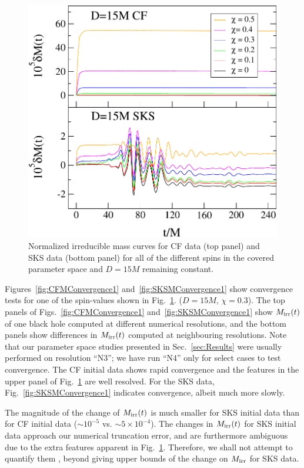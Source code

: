\begin{figure}
 \includegraphics[width=0.95\columnwidth]{chap5/MassIncreaseCFSKS}
  \caption{Normalized irreducible mass curves for CF data (top panel)
    and SKS data (bottom panel) for all of the different spins in the
    covered parameter space and $D=15M$ remaining constant. }
  \label{fig:MassIncreaseCFSKS}
\end{figure}

Figures~\ref{fig:CFMConvergence1} and~\ref{fig:SKSMConvergence1} show
convergence tests for one of the spin-values shown in
Fig.~\ref{fig:MassIncreaseCFSKS}.  ($D=15M$, $\chi=0.3$).  The top
panels of Figs.~\ref{fig:CFMConvergence1}
and~\ref{fig:SKSMConvergence1} show $M_{\rm irr}(t)$ of one black hole
computed at different numerical resolutions, and the bottom panels
show differences in $M_{\rm irr}(t)$ computed at neighbouring
resolutions.  Note that our parameter space studies presented in
Sec.~\ref{sec:Results} were usually performed on resolution ``N3''; we
have run ``N4'' only for select cases to test convergence.  The CF
initial data shows rapid convergence and the features in the upper
panel of Fig.~\ref{fig:MassIncreaseCFSKS} are well resolved.  For the
SKS data, Fig.~\ref{fig:SKSMConvergence1} indicates convergence,
albeit much more slowly.

The magnitude of the change of $M_{\rm irr}(t)$ is much smaller for
SKS initial data than for CF initial data ($\sim 10^{-5}$ vs. $\sim
5\times 10^{-4}$).  The changes in $M_{\rm irr}(t)$ for SKS initial
data approach our numerical truncation error, and are furthermore
ambiguous due to the extra features apparent in
Fig.~\ref{fig:MassIncreaseCFSKS}.  Therefore, we shall not attempt to
quantify them , beyond giving upper bounds of the change on
$M_{\rm irr}$ for SKS data.



